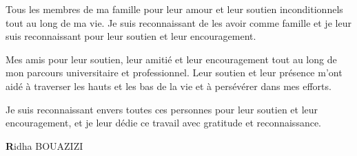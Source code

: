 Tous les membres de ma famille pour leur amour et leur soutien inconditionnels tout au long de ma vie. Je suis reconnaissant de les avoir comme famille et je leur suis reconnaissant pour leur soutien et leur encouragement. 

Mes amis pour leur soutien, leur amitié et leur encouragement tout au long de mon parcours universitaire et professionnel. Leur soutien et leur présence m'ont aidé à traverser les hauts et les bas de la vie et à persévérer dans mes efforts. 

Je suis reconnaissant envers toutes ces personnes pour leur soutien et leur encouragement, et je leur dédie ce travail avec gratitude et reconnaissance.

\begin{flushright}
\textbf Ridha BOUAZIZI
\end{flushright}